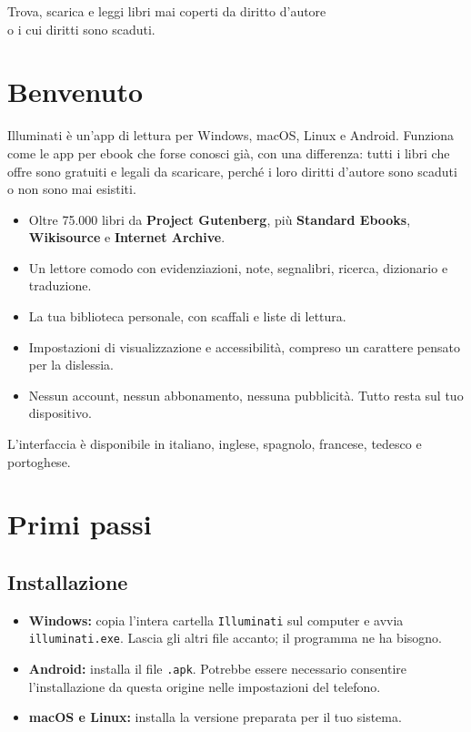 \documentclass[11pt]{article}
\begin{document}
%
  {Trova, scarica e leggi libri mai coperti da diritto d’autore\\o i cui diritti sono scaduti.}

{\setcounter{tocdepth}{1}\tableofcontents}
\newpage

\section{Benvenuto}

Illuminati è un’app di lettura per Windows, macOS, Linux e Android. Funziona come le app per
ebook che forse conosci già, con una differenza: tutti i libri che offre sono gratuiti e legali da
scaricare, perché i loro diritti d’autore sono scaduti o non sono mai esistiti.

\begin{itemize}
  \item Oltre 75.000 libri da \textbf{Project Gutenberg}, più \textbf{Standard Ebooks},
        \textbf{Wikisource} e \textbf{Internet Archive}.
  \item Un lettore comodo con evidenziazioni, note, segnalibri, ricerca, dizionario e traduzione.
  \item La tua biblioteca personale, con scaffali e liste di lettura.
  \item Impostazioni di visualizzazione e accessibilità, compreso un carattere pensato per la
        dislessia.
  \item Nessun account, nessun abbonamento, nessuna pubblicità. Tutto resta sul tuo dispositivo.
\end{itemize}

L’interfaccia è disponibile in italiano, inglese, spagnolo, francese, tedesco e portoghese.

\section{Primi passi}

\subsection{Installazione}
\begin{itemize}
  \item \textbf{Windows:} copia l’intera cartella \texttt{Illuminati} sul computer e avvia
        \texttt{illuminati.exe}. Lascia gli altri file accanto; il programma ne ha bisogno.
  \item \textbf{Android:} installa il file \texttt{.apk}. Potrebbe essere necessario consentire
        l’installazione da questa origine nelle impostazioni del telefono.
  \item \textbf{macOS e Linux:} installa la versione preparata per il tuo sistema.
\end{itemize}
\end{document}
